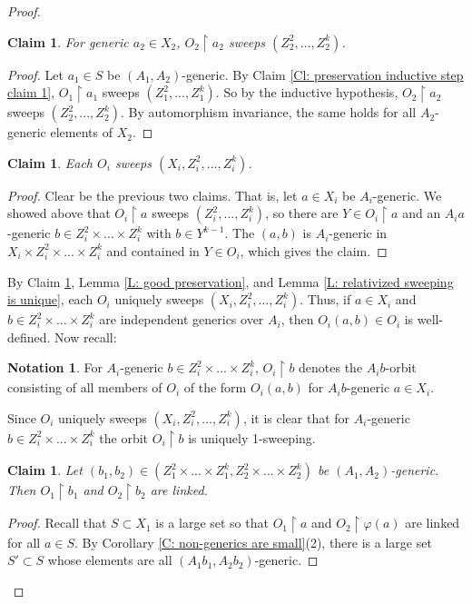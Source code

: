 \documentclass{amsart}
\newtheorem{claim}[theorem]{Claim}
\theoremstyle{definition}
\newtheorem{notation}[theorem]{Notation}
\begin{document}
\begin{proof}
    \begin{claim}\label{Cl: claim 2 inductive step}
        For generic $a_2\in X_2$, $O_2\restriction a_2$ sweeps $(Z_2^2,...,Z_2^k)$.
    \end{claim}
    \begin{proof}
        Let $a_1\in S$ be $(A_1,A_2)$-generic. By Claim \ref{Cl: preservation inductive step claim 1}, $O_1\restriction a_1$ sweeps $(Z_1^2,...,Z_1^k)$. So by the inductive hypothesis, $O_2\restriction a_2$ sweeps $(Z_2^2,...,Z_2^k)$. By automorphism invariance, the same holds for all $A_2$-generic elements of $X_2$.
    \end{proof}

    \begin{claim}\label{Cl: claim 3 inductive step}
    Each $O_i$ sweeps $(X_i,Z_i^2,...,Z_i^k)$.
    \end{claim}
    \begin{proof}
        Clear be the previous two claims. That is, let $a\in X_i$ be $A_i$-generic. We showed above that $O_i\restriction a$ sweeps $(Z_i^2,...,Z_i^k)$, so there are $Y\in O_i\restriction a$ and an $A_ia$-generic $b\in Z_i^2\times...\times Z_i^k$ with $b\in Y^{k-1}$. The $(a,b)$ is $A_i$-generic in $X_i\times Z_i^2\times...\times Z_i^k$ and contained in $Y\in O_i$, which gives the claim.
    \end{proof}

    By Claim \ref{Cl: claim 3 inductive step}, Lemma \ref{L: good preservation}, and Lemma \ref{L: relativized sweeping is unique}, each $O_i$ uniquely sweeps $(X_i,Z_i^2,...,Z_i^k)$. Thus, if $a\in X_i$ and $b\in Z_i^2\times...\times Z_i^k$ are independent generics over $A_i$, then $O_i(a,b)\in O_i$ is well-defined. Now recall:

    \begin{notation} For $A_i$-generic $b\in Z_i^2\times...\times Z_i^k$, $O_i\restriction b$ denotes the $A_ib$-orbit consisting of all members of $O_i$ of the form $O_i(a,b)$ for $A_ib$-generic $a\in X_i$.
    \end{notation}

    Since $O_i$ uniquely sweeps $(X_i,Z_i^2,...,Z_i^k)$, it is clear that for $A_i$-generic $b\in Z_i^2\times...\times Z_i^k$ the orbit $O_i\restriction b$ is uniquely 1-sweeping.

    \begin{claim}\label{Cl: claim 4 inductive step}
        Let $(b_1,b_2)\in(Z_1^2\times...\times Z_1^k,Z_2^2\times...\times Z_2^k)$ be $(A_1,A_2)$-generic. Then $O_1\restriction b_1$ and $O_2\restriction b_2$ are linked.
    \end{claim}
    \begin{proof}
        Recall that $S\subset X_1$ is a large set so that $O_1\restriction a$ and $O_2\restriction\varphi(a)$ are linked for all $a\in S$. By Corollary \ref{C: non-generics are small}(2), there is a large set $S'\subset S$ whose elements are all $(A_1b_1,A_2b_2)$-generic.


\end{proof}
\end{proof}
\end{document}
